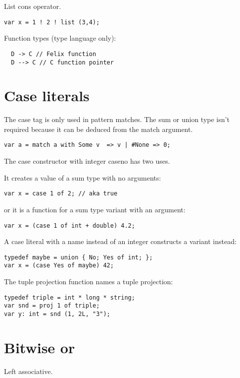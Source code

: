 \documentclass[oneside]{book}
\begin{document}
List cons operator.

\begin{verbatim}
var x = 1 ! 2 ! list (3,4);
\end{verbatim}


Function types (type language only):

\begin{verbatim}
  D -> C // Felix function
  D --> C // C function pointer
\end{verbatim}


\section{Case literals}

The case tag is only used in pattern matches.
The sum or union type isn't required because it can be deduced
from the match argument.

\begin{verbatim}
var a = match a with Some v  => v | #None => 0;
\end{verbatim}


The case constructor with integer caseno has two uses. 

It creates a value of
a sum type with no arguments:

\begin{verbatim}
var x = case 1 of 2; // aka true
\end{verbatim}

or it is a function for a sum type variant with an argument:

\begin{verbatim}
var x = (case 1 of int + double) 4.2;
\end{verbatim}


A case literal with a name instead of an integer constructs
a variant instead:

\begin{verbatim}
typedef maybe = union { No; Yes of int; };
var x = (case Yes of maybe) 42;
\end{verbatim}


The tuple projection function names a tuple projection:

\begin{verbatim}
typedef triple = int * long * string;
var snd = proj 1 of triple;
var y: int = snd (1, 2L, "3");
\end{verbatim}


\section{Bitwise or}
Left associative.
\end{document}
